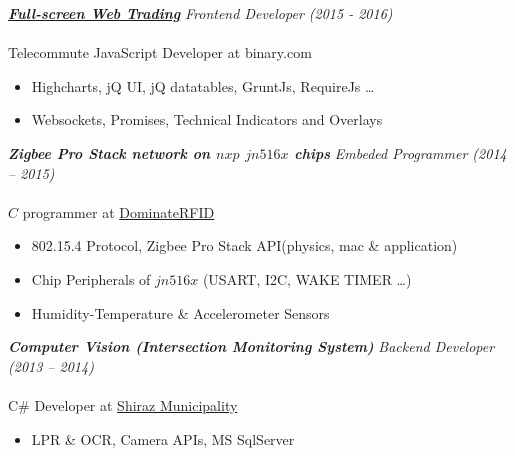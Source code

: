 \documentclass{article}
\newcommand{\hh}[1]{\large{\textit{\textbf{#1}}}}
\renewcommand{\i}[1]{\normalsize{\textit{#1}}}
\begin{document}
\hh{\href{https://webtrader.binary.com}{Full-screen Web Trading}} \hfill \i{Frontend Developer (2015 - 2016)} \\ \vspace {-.35cm} \\
Telecommute JavaScript Developer at binary.com \\ \vspace{-.9cm}
\begin{itemize}
 \setlength{\itemsep}{1pt} \setlength{\parskip}{0pt} \setlength{\parsep}{0pt}
    \item Highcharts, jQ UI, jQ datatables, GruntJs, RequireJs \dots
    \item Websockets, Promises, Technical Indicators and Overlays
\end{itemize}

\hh{Zigbee Pro Stack network on $nxp$ $jn516x$ chips} \hfill \i{Embeded Programmer (2014 -- 2015)} \\ \vspace{-.35cm} \\
$C$ programmer at \href{http://www.dominaterfid.com/}{DominateRFID} \\ \vspace{-.9cm}
\begin{itemize}
 \setlength{\itemsep}{1pt} \setlength{\parskip}{0pt} \setlength{\parsep}{0pt}
    \item 802.15.4 Protocol, Zigbee Pro Stack API(physics, mac \& application)
    \item Chip Peripherals of $jn516x$ (USART, I2C, WAKE TIMER \dots)
    \item Humidity-Temperature \& Accelerometer Sensors
\end{itemize}

\hh{Computer Vision (Intersection Monitoring System)} \hfill \i{Backend Developer (2013 -- 2014)} \\ \vspace{-.35cm} \\
C\# Developer at \href{https://portal.shiraz.ir/}{Shiraz Municipality} \\ \vspace {-.90cm}
\begin{itemize}
 \setlength{\itemsep}{1pt} \setlength{\parskip}{0pt} \setlength{\parsep}{0pt}
 \item LPR \& OCR, Camera APIs, MS SqlServer
\end{itemize}
\end{document}
